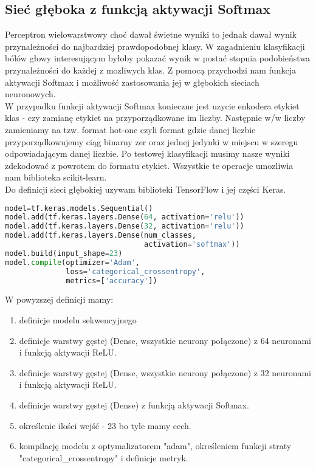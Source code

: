 \subsection{Sieć głęboka z funkcją aktywacji Softmax}
Perceptron wielowarstwowy choć dawał świetne wyniki to jednak dawał wynik przynależności do najbardziej prawdopodobnej klasy. W zagadnieniu klasyfikacji bólów głowy interesującym byłoby pokazać wynik w postać stopnia podobieństwa przynależności do każdej z mozliwych klas. Z pomocą przychodzi nam funkcja aktywacji Softmax i możliwość zastosowania jej w głębokich sieciach neuronowych.\\

W przypadku funkcji aktywacji Softmax konieczne jest uzycie enkodera etykiet klas - czy zamianę etykiet na przyporządkowane im liczby. Następnie w/w liczby zamieniamy na tzw. format hot-one czyli format gdzie danej liczbie przyporządkowujemy ciąg binarny zer oraz jednej jedynki w miejscu w szeregu odpowiadającym danej liczbie. Po testowej klasyfikacji musimy nasze wyniki zdekodować z powrotem do formatu etykiet. Wszystkie te operacje umozliwia nam biblioteka scikit-learn.\\

Do definicji sieci głębokiej uzywam biblioteki TensorFlow i jej części Keras.
\begin{lstlisting}[language=Python, caption=Definicja sieci głębokiej z funkcją aktywacji Softmax]
model=tf.keras.models.Sequential()
model.add(tf.keras.layers.Dense(64, activation='relu'))
model.add(tf.keras.layers.Dense(32, activation='relu'))
model.add(tf.keras.layers.Dense(num_classes, 
                                activation='softmax'))
model.build(input_shape=23)
model.compile(optimizer='Adam',
              loss='categorical_crossentropy',
              metrics=['accuracy'])
\end{lstlisting}

W powyzszej definicji mamy:
\begin{enumerate}
    \item definicje modelu sekwencyjnego
    \item definicje warstwy gęstej (Dense, wszystkie neurony połączone) z 64 neuronami i funkcją aktywacji ReLU.
    \item definicje warstwy gęstej (Dense, wszystkie neurony połączone) z 32 neuronami i funkcją aktywacji ReLU. 
    \item definicje warstwy gęstej (Dense) z funkcją aktywacji Softmax.
    \item określenie ilości wejść - 23 bo tyle mamy cech.
    \item kompilację modelu z optymalizatorem "adam", określeniem funkcji straty "categorical\_crossentropy" i definicje metryk.
\end{enumerate}


